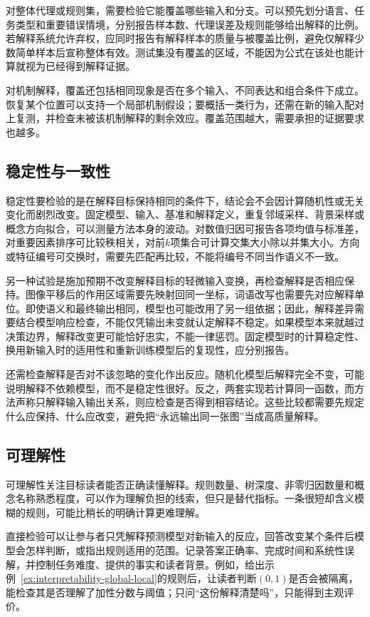 对整体代理或规则集，需要检验它能覆盖哪些输入和分支。可以预先划分语言、任务类型和重要错误情境，分别报告样本数、代理误差及规则能够给出解释的比例。若解释系统允许弃权，应同时报告有解释样本的质量与被覆盖比例，避免仅解释少数简单样本后宣称整体有效。测试集没有覆盖的区域，不能因为公式在该处也能计算就视为已经得到解释证据。

对机制解释，覆盖还包括相同现象是否在多个输入、不同表达和组合条件下成立。恢复某个位置可以支持一个局部机制假设；要概括一类行为，还需在新的输入配对上复测，并检查未被该机制解释的剩余效应。覆盖范围越大，需要承担的证据要求也越多。

\subsection{稳定性与一致性}
\label{sec:interpretability-quality-stability}

稳定性要检验的是在解释目标保持相同的条件下，结论会不会因计算随机性或无关变化而剧烈改变。固定模型、输入、基准和解释定义，重复邻域采样、背景采样或概念方向拟合，可以测量方法本身的波动。对数值归因可报告各项均值与标准差，对重要因素排序可比较秩相关，对前$k$项集合可计算交集大小除以并集大小。方向或特征编号可交换时，需要先匹配再比较，不能将编号不同当作语义不一致。

另一种试验是施加预期不改变解释目标的轻微输入变换，再检查解释是否相应保持。图像平移后的作用区域需要先映射回同一坐标，词语改写也需要先对应解释单位。即使语义和最终输出相同，模型也可能改用了另一组依据；因此，解释差异需要结合模型响应检查，不能仅凭输出未变就认定解释不稳定。如果模型本来就越过决策边界，解释改变更可能恰好忠实，不能一律惩罚。固定模型时的计算稳定性、换用新输入时的适用性和重新训练模型后的复现性，应分别报告。

还需检查解释是否对不该忽略的变化作出反应。随机化模型后解释完全不变，可能说明解释不依赖模型，而不是稳定性很好。反之，两套实现若计算同一函数，而方法声称只解释输入输出关系，则应检查是否得到相容结论。这些比较都需要先规定什么应保持、什么应改变，避免把“永远输出同一张图”当成高质量解释。

\subsection{可理解性}
\label{sec:interpretability-quality-comprehensibility}

可理解性关注目标读者能否正确读懂解释。规则数量、树深度、非零归因数量和概念名称熟悉程度，可以作为理解负担的线索，但只是替代指标。一条很短却含义模糊的规则，可能比稍长的明确计算更难理解。

直接检验可以让参与者只凭解释预测模型对新输入的反应，回答改变某个条件后模型会怎样判断，或指出规则适用的范围。记录答案正确率、完成时间和系统性误解，并控制任务难度、提供的事实和读者背景。例如，给出示例~\ref{ex:interpretability-global-local}的规则后，让读者判断$(0,1)$是否会被隔离，能检查其是否理解了加性分数与阈值；只问“这份解释清楚吗”，只能得到主观评价。

